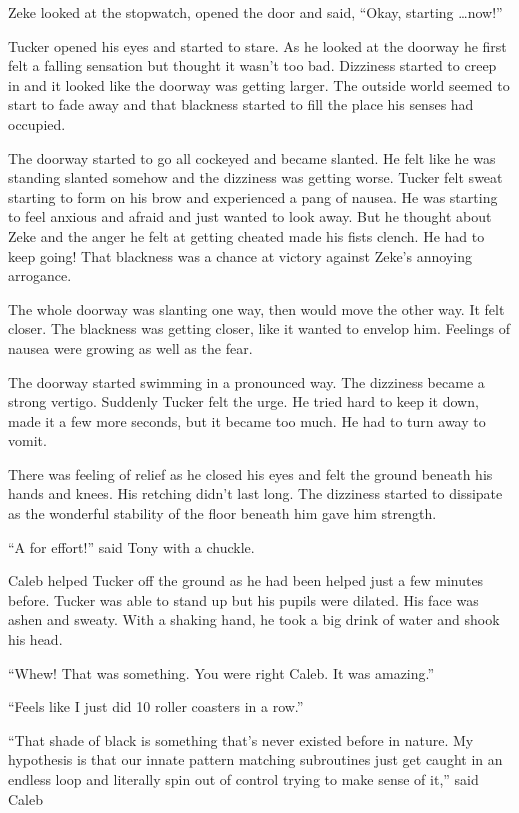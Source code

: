 Zeke looked at the stopwatch, opened the door and said, ``Okay,
starting \ldots now!''

Tucker opened his eyes and started to stare.  As he looked at
the doorway he first felt a falling sensation but thought it
wasn't too bad. Dizziness started to creep in and it looked like
the doorway was getting larger. The outside world seemed to
start to fade away and that blackness started to fill the place
his senses had occupied.

The doorway started to go all cockeyed and became slanted. He
felt like he was standing slanted somehow and the dizziness was
getting worse. Tucker felt sweat starting to form on his brow
and experienced a pang of nausea. He was starting to feel
anxious and afraid and just wanted to look away.  But he thought
about Zeke and the anger he felt at getting cheated made his
fists clench. He had to keep going! That blackness was a chance
at victory against Zeke's annoying arrogance.

The whole doorway was slanting one way, then would move the
other way. It felt closer. The blackness was getting closer,
like it wanted to envelop him.  Feelings of nausea were growing
as well as the fear.

The doorway started swimming in a pronounced way. The
dizziness became a strong vertigo. Suddenly Tucker felt the
urge. He tried hard to keep it down, made it a few more seconds,
but it became too much. He had to turn away to vomit.

There was feeling of relief as he closed his eyes and felt the
ground beneath his hands and knees. His retching didn't last
long.  The dizziness started to dissipate as the wonderful
stability of the floor beneath him gave him strength.

``A for effort!'' said Tony with a chuckle.

Caleb helped Tucker off the ground as he had been helped just a
few minutes before. Tucker was able to stand up but his pupils
were dilated. His face was ashen and sweaty. With a shaking
hand, he took a big drink of water and shook his head.

``Whew! That was something. You were right Caleb. It was
amazing.''

``Feels like I just did 10 roller coasters in a row.''

``That shade of black is something that's never existed before
in nature. My hypothesis is that our innate pattern matching
subroutines just get caught in an endless loop and literally
spin out of control trying to make sense of it,'' said Caleb

